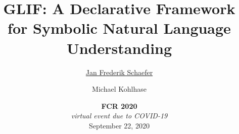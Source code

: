 \documentclass{beamer}
\title{GLIF: A Declarative Framework for Symbolic Natural Language Understanding}
\author{\underline{Jan Frederik Schaefer} \and Michael Kohlhase}
\institute{FAU Erlangen-N\"urnberg}
\date{\textbf{FCR 2020} \\ \textit{virtual event due to COVID-19} \\ September 22, 2020 }
\begin{document}
\frame\titlepage


\end{document}
